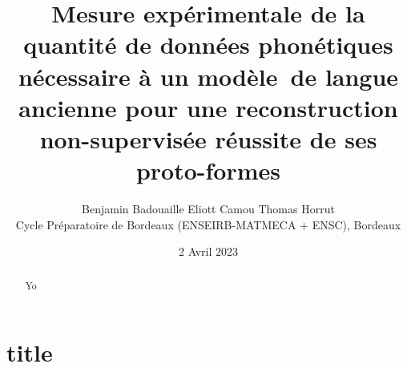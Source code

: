 \documentclass[11pt, french]{article}
\title{Mesure expérimentale de la quantité de données phonétiques nécessaire à un modèle\
de langue ancienne pour une reconstruction non-supervisée réussite de ses proto-formes}
\author{Benjamin Badouaille \qquad Eliott Camou \qquad Thomas Horrut \\
    Cycle Préparatoire de Bordeaux (ENSEIRB-MATMECA + ENSC), Bordeaux}
\date{2 Avril 2023}
\begin{document}
\maketitle
\begin{abstract}
    Yo
\end{abstract}
\section*{title}
\end{document}
